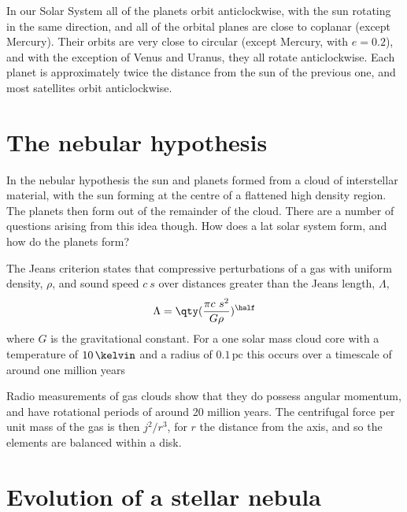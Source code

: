 In our Solar System all of the planets orbit anticlockwise, with the
sun rotating in the same direction, and all of the orbital planes are
close to coplanar (except Mercury). Their orbits are very close to
circular (except Mercury, with $e=0.2$), and with the exception of
Venus and Uranus, they all rotate anticlockwise. Each planet is
approximately twice the distance from the sun of the previous one, and
most satellites orbit anticlockwise.

\section{The nebular hypothesis}
\label{sec:nebular-hypothesis}

In the nebular hypothesis the sun and planets formed from a cloud of
interstellar material, with the sun forming at the centre of a
flattened high density region. The planets then form out of the
remainder of the cloud. There are a number of questions arising from
this idea though. How does a lat solar system form, and how do the
planets form?

The Jeans criterion states that compressive perturbations of a gas
with uniform density, $\rho$, and sound speed $c~s$ over distances
greater than the Jeans length, $\Lambda$,
\begin{equation}
  \label{eq:35}
  \Lambda = \qty( \frac{\pi c~s^2}{G \rho})^{\half}
\end{equation}
where $G$ is the gravitational constant. For a one solar mass cloud
core with a temperature of $10\,\kelvin$ and a radius of
$0.1\,\text{pc}$ this occurs over a timescale of around one million
years

Radio measurements of gas clouds show that they do possess angular
momentum, and have rotational periods of around 20 million years. The
centrifugal force per unit mass of the gas is then $j^2/r^3$, for $r$
the distance from the axis, and so the elements are balanced within a
disk.

\section{Evolution of  a stellar nebula}
\label{sec:evol-astell-nebula}

